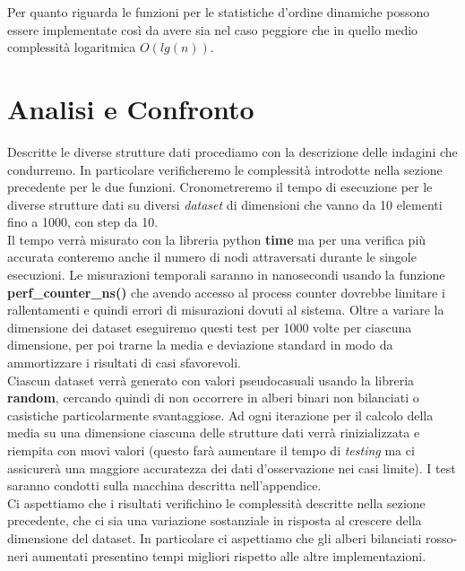 \documentclass{article}
\begin{document}
\noindent Per quanto riguarda le funzioni per le statistiche d'ordine dinamiche possono essere implementate così da avere sia nel caso peggiore che in quello medio complessità logaritmica $O(lg(n))$.

\section*{Analisi e Confronto}
\noindent Descritte le diverse strutture dati procediamo con la descrizione delle indagini che condurremo. In particolare verificheremo le complessità introdotte nella sezione precedente per le due funzioni. Cronometreremo il tempo di esecuzione per le diverse strutture dati su diversi \textit{dataset} di dimensioni che vanno da 10 elementi fino a 1000, con step da 10. \\

\noindent Il tempo verrà misurato con la libreria python \textbf{time} ma per una verifica più accurata conteremo anche il numero di nodi attraversati durante le singole esecuzioni. Le misurazioni temporali saranno in nanosecondi usando la funzione \textbf{perf\_counter\_ns()} che avendo accesso al process counter dovrebbe limitare i rallentamenti e quindi errori di misurazioni dovuti al sistema. Oltre a variare la dimensione dei dataset eseguiremo questi test per 1000 volte per ciascuna dimensione, per poi trarne la media e deviazione standard in modo da ammortizzare i risultati di casi sfavorevoli. \\

\noindent Ciascun dataset verrà generato con valori pseudocasuali usando la libreria \textbf{random}, cercando quindi di non occorrere in alberi binari non bilanciati o casistiche particolarmente svantaggiose. Ad ogni iterazione per il calcolo della media su una dimensione ciascuna delle strutture dati verrà rinizializzata e riempita con nuovi valori (questo farà aumentare il tempo di \textit{testing} ma ci assicurerà una maggiore accuratezza dei dati d'osservazione nei casi limite). I test saranno condotti sulla macchina descritta nell'appendice. \\

\noindent Ci aspettiamo che i risultati verifichino le complessità descritte nella sezione precedente, che ci sia una variazione sostanziale in risposta al crescere della dimensione del dataset. In particolare ci aspettiamo che gli alberi bilanciati rosso-neri aumentati presentino tempi migliori rispetto alle altre implementazioni. \\
\end{document}
